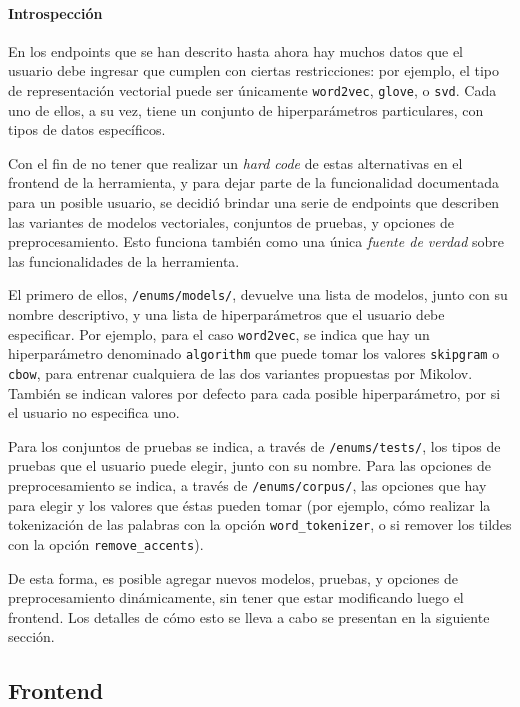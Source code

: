 \paragraph{Introspección}

En los endpoints que se han descrito hasta ahora hay muchos datos que el usuario debe ingresar que
cumplen con ciertas restricciones: por ejemplo, el tipo de representación vectorial puede ser
únicamente \texttt{word2vec}, \texttt{glove}, o \texttt{svd}. Cada uno de ellos, a su vez, tiene un
conjunto de hiperparámetros particulares, con tipos de datos específicos.

Con el fin de no tener que realizar un \textit{hard code} de estas alternativas en el frontend de la
herramienta, y para dejar parte de la funcionalidad documentada para un posible usuario, se decidió
brindar una serie de endpoints que describen las variantes de modelos vectoriales, conjuntos de
pruebas, y opciones de preprocesamiento. Esto funciona también como una única \textit{fuente de
verdad} sobre las funcionalidades de la herramienta.

El primero de ellos, \texttt{/enums/models/}, devuelve una lista de modelos, junto con su nombre
descriptivo, y una lista de hiperparámetros que el usuario debe especificar. Por ejemplo, para el
caso \texttt{word2vec}, se indica que hay un hiperparámetro denominado \texttt{algorithm} que puede
tomar los valores \texttt{skipgram} o \texttt{cbow}, para entrenar cualquiera de las dos variantes
propuestas por Mikolov. También se indican valores por defecto para cada posible hiperparámetro, por
si el usuario no especifica uno.

Para los conjuntos de pruebas se indica, a través de \texttt{/enums/tests/}, los tipos de pruebas
que el usuario puede elegir, junto con su nombre. Para las opciones de preprocesamiento se indica, a
través de \texttt{/enums/corpus/}, las opciones que hay para elegir y los valores que éstas pueden
tomar (por ejemplo, cómo realizar la tokenización de las palabras con la opción
\texttt{word\_tokenizer}, o si remover los tildes con la opción \texttt{remove\_accents}).


De esta forma, es posible agregar nuevos modelos, pruebas, y opciones de preprocesamiento
dinámicamente, sin tener que estar modificando luego el frontend. Los detalles de cómo esto se lleva
a cabo se presentan en la siguiente sección.


\subsection{Frontend}

